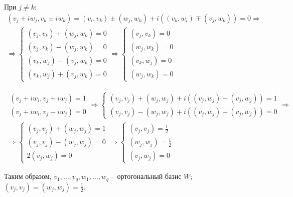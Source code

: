 \documentclass[main]{subfiles}
\begin{document}
При $j \neq k$: 
\begin{gather*}
    (v_j + iw_j, v_k \pm iw_k) = (v_i, v_k) \pm (w_j, w_k) + i((v_k, w_i) \mp (v_j, w_k)) = 0 \Rightarrow \\ \Rightarrow
\left\{ \begin{gathered} 
    (v_j, v_k) + (w_j, w_k) = 0 \\
    (v_j, v_k) - (w_j, w_k) = 0 \\
    (v_k, w_j) - (v_j, w_k) = 0 \\
    (v_k, w_j) + (v_j, w_k) = 0 
\end{gathered} \right. \Rightarrow \left\{ \begin{gathered} 
    (v_j, v_k) = 0 \\
    (w_j, w_k) = 0 \\
    (v_k, w_j) = 0 \\
    (w_j, w_k) = 0 
\end{gathered} \right.
\end{gather*} 

\begin{gather*}
    \begin{gathered} 
        (v_j + iw_i, v_j + iw_j) = 1 \\
        (v_j + iw_i, v_j - iw_j) = 0 
    \end{gathered} \Rightarrow \left\{ \begin{gathered} 
        (v_j, v_j) + (w_j, w_j) + i((v_j, w_j) - (v_j, w_j)) = 1 \\
        (v_j, v_j) - (w_j, w_j) + i((v_j, w_j) + (v_j, w_j)) = 0 
    \end{gathered} \right.  \Rightarrow \\
    \Rightarrow 
    \left \{ 
        \begin{gathered} 
        (v_j, v_j) + (w_j, w_j) = 1 \\
        (v_j, v_j) - (w_j, w_j) = 0 \\
        2(v_j, w_j) = 0
    \end{gathered} \right. 
    \Rightarrow 
    \left \{ 
        \begin{gathered} 
        (v_j, v_j) = \frac{1}{2} \\
        (w_j, w_j) = \frac{1}{2} \\
        (v_j, w_j) = 0
    \end{gathered} \right. 
\end{gather*}

Таким образом, $v_1, \ldots, v_q, w_1, \ldots, w_q$ -- ортогональный базис $W$; $(v_j, v_j) = (w_j, w_j) = \frac{1}{2}$.
\end{document}
